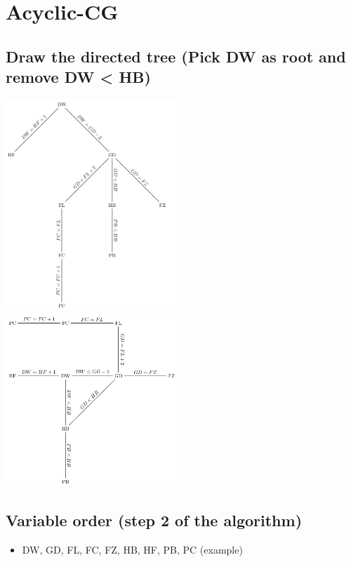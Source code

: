 \documentclass[conference]{styles/acmsiggraph}
\begin{document}
\section{Acyclic-CG}

\subsection{Draw the directed tree (Pick DW as root and remove DW < HB)}

\includegraphics[width=0.5\textwidth]{imgs/tree2.png}
\includegraphics[width=0.5\textwidth]{imgs/constraint.png}

\subsection{Variable order (step 2 of the algorithm)}

\begin{itemize}
    \item DW, GD, FL, FC, FZ, HB, HF, PB, PC (example)
\end{itemize}

\end{document}
